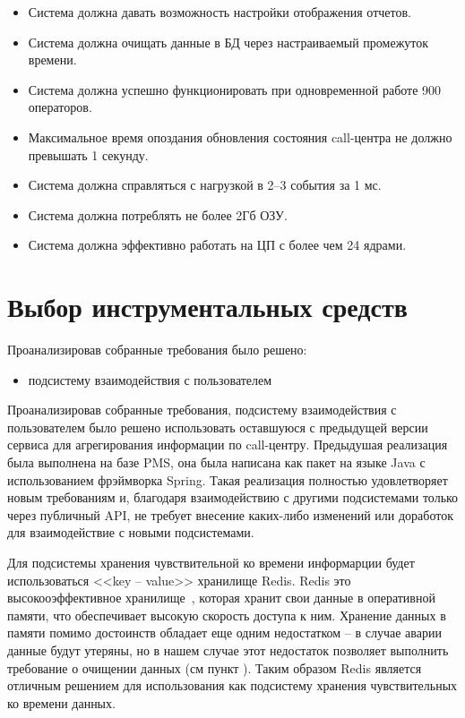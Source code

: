 \begin{itemize}
    \item Система должна давать возможность настройки отображения отчетов.
    \item Система должна очищать данные в БД через настраиваемый промежуток времени.
    \item Система должна успешно функционировать при одновременной работе 900 операторов.
    \item Максимальное время опоздания обновления состояния call-центра не должно превышать 1 секунду.
    \item Система должна справляться с нагрузкой в 2--3 события за 1 мс.
    \item Система должна потреблять не более 2Гб ОЗУ.
    \item Система должна эффективно работать на ЦП с более чем 24 ядрами.
\end{itemize}


\section{Выбор инструментальных средств}

Проанализировав собранные требования было решено:
\begin{itemize}
    \item подсистему взаимодействия с пользователем
\end{itemize}

Проанализировав собранные требования, подсистему взаимодействия с пользователем было решено
использовать оставшуюся с предыдущей версии сервиса для агрегирования информации по call-центру.
Предыдушая реализация была выполнена на базе PMS, она была написана как пакет на языке Java с
использованием фрэймворка Spring.
Такая реализация полностью удовлетворяет новым требованиям
и, благодаря взаимодействию с другими подсистемами только через публичный API,
не требует внесение каких-либо изменений или доработок для взаимодействие с новыми подсистемами.

Для подсистемы хранения чувствительной ко времени информарции будет использоваться
<<key -- value>> хранилище Redis.
Redis это высокооэффективное хранилище~\cite{}, %
которая хранит свои данные в оперативной памяти,
что обеспечивает высокую скорость доступа к ним.
Хранение данных в памяти помимо достоинств обладает еще одним недостатком --
в случае аварии данные будут утеряны,
но в нашем случае этот недостаток позволяет выполнить требование о очищении данных (см пункт ). %
Таким образом Redis является отличным решением для использования как подсистему хранения
чувствительных ко времени данных.


